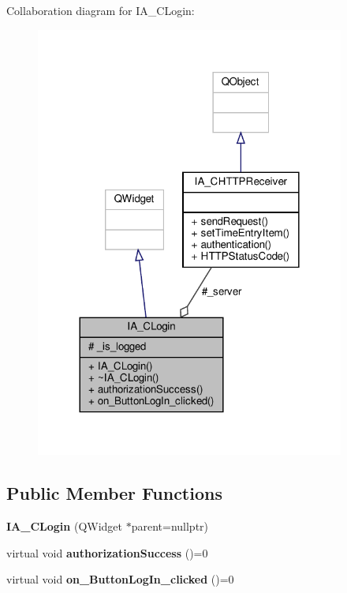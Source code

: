 Collaboration diagram for I\+A\+\_\+\+C\+Login\+:
\nopagebreak
\begin{figure}[H]
\begin{center}
\leavevmode
\includegraphics[width=288pt]{classIA__CLogin__coll__graph}
\end{center}
\end{figure}
\subsection*{Public Member Functions}
\begin{DoxyCompactItemize}
\item 
\mbox{\label{classIA__CLogin_a00ba49ec868c8bc893a27c3d821514dd}} 
{\bfseries I\+A\+\_\+\+C\+Login} (Q\+Widget $\ast$parent=nullptr)
\item 
\mbox{\label{classIA__CLogin_a42fecb02034563ce92ab33e616a2f95f}} 
virtual void {\bfseries authorization\+Success} ()=0
\item 
\mbox{\label{classIA__CLogin_ac4ec51bb857f39df704c54f991d3aa46}} 
virtual void {\bfseries on\+\_\+\+Button\+Log\+In\+\_\+clicked} ()=0
\end{DoxyCompactItemize}
